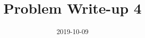 \documentclass[a4paper,12pt]{article}
\title{Problem Write-up 4}
\date{2019-10-09}
\begin{document}
	\begin{problem}
			
	\end{problem}
	\begin{answer}
		
	\end{answer}
\end{document}
